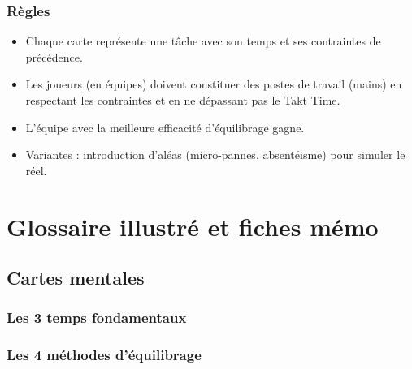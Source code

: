\documentclass[12pt,a4paper]{article}
\begin{document}
\begin{center}
\subsubsection{Règles}
\begin{itemize}
    \item Chaque carte représente une tâche avec son temps et ses contraintes de précédence.
    \item Les joueurs (en équipes) doivent constituer des postes de travail (mains) en respectant les contraintes et en ne dépassant pas le Takt Time.
    \item L’équipe avec la meilleure efficacité d’équilibrage gagne.
    \item Variantes : introduction d’aléas (micro-pannes, absentéisme) pour simuler le réel.
\end{itemize}

\section{Glossaire illustré et fiches mémo}

\subsection{Cartes mentales}
\subsubsection{Les 3 temps fondamentaux}

\begin{center}
\end{center}

\subsubsection{Les 4 méthodes d’équilibrage}


\end{center}
\end{document}
